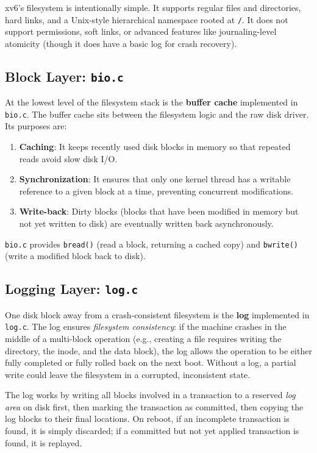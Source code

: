 \documentclass[11pt]{article}
\begin{document}
xv6's filesystem is intentionally simple. It supports regular files and directories, hard links, and a Unix-style hierarchical namespace rooted at \texttt{/}. It does not support permissions, soft links, or advanced features like journaling-level atomicity (though it does have a basic log for crash recovery).

\subsection{Block Layer: \texttt{bio.c}}

At the lowest level of the filesystem stack is the \textbf{buffer cache} implemented in \texttt{bio.c}. The buffer cache sits between the filesystem logic and the raw disk driver. Its purposes are:

\begin{enumerate}
    \item \textbf{Caching}: It keeps recently used disk blocks in memory so that repeated reads avoid slow disk I/O.
    \item \textbf{Synchronization}: It ensures that only one kernel thread has a writable reference to a given block at a time, preventing concurrent modifications.
    \item \textbf{Write-back}: Dirty blocks (blocks that have been modified in memory but not yet written to disk) are eventually written back asynchronously.
\end{enumerate}

\texttt{bio.c} provides \texttt{bread()} (read a block, returning a cached copy) and \texttt{bwrite()} (write a modified block back to disk).

\subsection{Logging Layer: \texttt{log.c}}

One disk block away from a crash-consistent filesystem is the \textbf{log} implemented in \texttt{log.c}. The log ensures \emph{filesystem consistency}: if the machine crashes in the middle of a multi-block operation (e.g., creating a file requires writing the directory, the inode, and the data block), the log allows the operation to be either fully completed or fully rolled back on the next boot. Without a log, a partial write could leave the filesystem in a corrupted, inconsistent state.

The log works by writing all blocks involved in a transaction to a reserved \emph{log area} on disk first, then marking the transaction as committed, then copying the log blocks to their final locations. On reboot, if an incomplete transaction is found, it is simply discarded; if a committed but not yet applied transaction is found, it is replayed.
\end{document}
